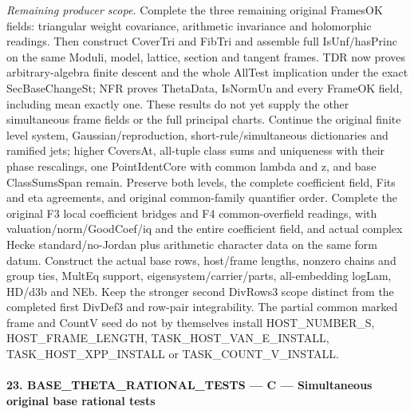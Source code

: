 \emph{Remaining producer scope.} Complete the three remaining original FramesOK fields: triangular weight covariance, arithmetic invariance and holomorphic readings. Then construct CoverTri and FibTri and assemble full IsUnf/hasPrinc on the same Moduli, model, lattice, section and tangent frames. TDR now proves arbitrary-algebra finite descent and the whole AllTest implication under the exact SecBaseChangeSt; NFR proves ThetaData, IsNormUn and every FrameOK field, including mean exactly one. These results do not yet supply the other simultaneous frame fields or the full principal charts. Continue the original finite level system, Gaussian/reproduction, short-rule/simultaneous dictionaries and ramified jets; higher CoversAt, all-tuple class sums and uniqueness with their phase rescalings, one PointIdentCore with common lambda and z, and base ClassSumsSpan remain. Preserve both levels, the complete coefficient field, Fits and eta agreements, and original common-family quantifier order. Complete the original F3 local coefficient bridges and F4 common-overfield readings, with valuation/norm/GoodCoef/iq and the entire coefficient field, and actual complex Hecke standard/no-Jordan plus arithmetic character data on the same form datum. Construct the actual base rows, host/frame lengths, nonzero chains and group ties, MultEq support, eigensystem/carrier/parts, all-embedding logLam, HD/d3b and NEb. Keep the stronger second DivRows3 scope distinct from the completed first DivDef3 and row-pair integrability. The partial common marked frame and CountV seed do not by themselves install HOST\_\allowbreak NUMBER\_\allowbreak S, HOST\_\allowbreak FRAME\_\allowbreak LENGTH, TASK\_\allowbreak HOST\_\allowbreak VAN\_\allowbreak E\_\allowbreak INSTALL, TASK\_\allowbreak HOST\_\allowbreak XPP\_\allowbreak INSTALL or TASK\_\allowbreak COUNT\_\allowbreak V\_\allowbreak INSTALL.



\paragraph{23. BASE\_\allowbreak THETA\_\allowbreak RATIONAL\_\allowbreak TESTS — C — Simultaneous original base rational tests}

